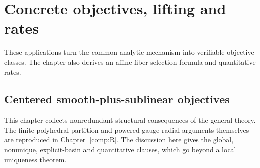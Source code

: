 \chapter{Concrete objectives, lifting and rates}\label{comp:F}\label{F:chapter}
\renewcommand{\ModuleTag}{6}
These applications turn the common analytic mechanism into verifiable objective classes. The chapter also derives an affine-fiber selection formula and quantitative rates.


\section{Centered smooth-plus-sublinear objectives}

This chapter collects nonredundant structural consequences of the general theory. The finite-polyhedral-partition and powered-gauge radial arguments themselves are reproduced in Chapter~\ref{comp:R}. The discussion here gives the global, nonunique, explicit-basin and quantitative clauses, which go beyond a local uniqueness theorem.

